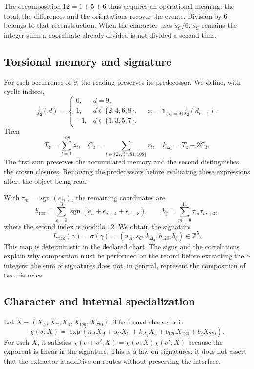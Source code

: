 The decomposition \(12=1+5+6\) thus acquires an operational meaning:
the total, the differences and the orientations recover the events.
Division by \(6\) belongs to that reconstruction. When the character
uses \(s_C/6\), \(s_C\) remains the integer sum; a coordinate already
divided is not divided a second time.

\subsection{Torsional memory and signature}

For each occurrence of \(9\), the reading preserves its predecessor.
We define, with cyclic indices,
\[
 j_2(d)=\begin{cases}0,&d=9,\\1,&d\in\{2,4,6,8\},\\-1,&d\in\{1,3,5,7\},\end{cases}
 \quad z_t=\mathbf1_{\{d_t=9\}}j_2(d_{t-1}).
\]
Then
\[
 T_z=\sum_{t=1}^{108}z_t,\quad
 C_z=\sum_{t\in\{27,54,81,108\}}z_t,\quad
 k_{\Delta_4}=T_z-2C_z.
\]
The first sum preserves the accumulated memory and the second distinguishes the
crown closures. Removing the predecessors before evaluating these
expressions alters the object being read.

With \(\tau_m=\operatorname{sgn}(e_m)\), the remaining coordinates are
\[
 b_{120}=\sum_{a=0}^{3}\operatorname{sgn}(e_a+e_{a+4}+e_{a+8}),
 \qquad b_{\zeta}=\sum_{m=0}^{11}\tau_m\tau_{m+3},
\]
where the second index is modulo \(12\). We obtain the signature
\[
 L_{\mathrm{tick}}(\gamma)
 =\sigma(\gamma)=(n_A,s_C,k_{\Delta_4},b_{120},b_{\zeta})\in\mathbb Z^5.
\]
This map is deterministic in the declared chart. The signs and the
correlations explain why composition must be performed on the
record before extracting the \(5\) integers: the sum of signatures does not,
in general, represent the composition of two histories.

\subsection{Character and internal specialization}

Let \(X=(X_A,X_C,X_4,X_{120},X_{270})\). The formal character is
\[
 \chi(\sigma;X)=\exp\!\left(n_AX_A+s_CX_C+k_{\Delta_4}X_4+
 b_{120}X_{120}+b_{\zeta}X_{270}\right).
\]
For each \(X\), it satisfies
\(\chi(\sigma+\sigma';X)=\chi(\sigma;X)\chi(\sigma';X)\)
because the exponent is linear in the signature. This is a law on signatures; it does not
assert that the extractor is additive on routes without preserving the interface.

